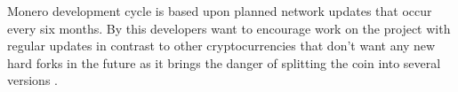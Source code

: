 \documentclass[
  printed, %
  table,   %
  nolof,     %
  nolot,     %
           oneside, color
]{fithesis3}
\newcommand\ytl[2]{
\parbox[b]{8em}{\hfill{\color{cyan}\bfseries\sffamily #1}~$\cdots\cdots$~}\makebox[0pt][c]{$\bullet$}\vrule\quad \parbox[c]{.7\linewidth}{\vspace{7pt}\color{red!40!black!80}\raggedright\sffamily #2.\\[7pt]}\\[-3pt]}
\begin{document}

Monero development cycle is based upon planned network updates that occur every six months. By this developers want to encourage work on the project with regular updates in contrast to other cryptocurrencies that don't want any new hard forks in the future as it brings the danger of splitting the coin into several versions \cite{mccorry2017atomically}.

\iffalse
\begin{itemize}\itemsep0em
\item The community knows that updating is the way forward.
\item Enhanced ASIC resistance by changing the mining algorithm.
\item There is always an opportunity to push updated code and improvements in a biannual cycle.
\end{itemize}
\fi


\end{document}
